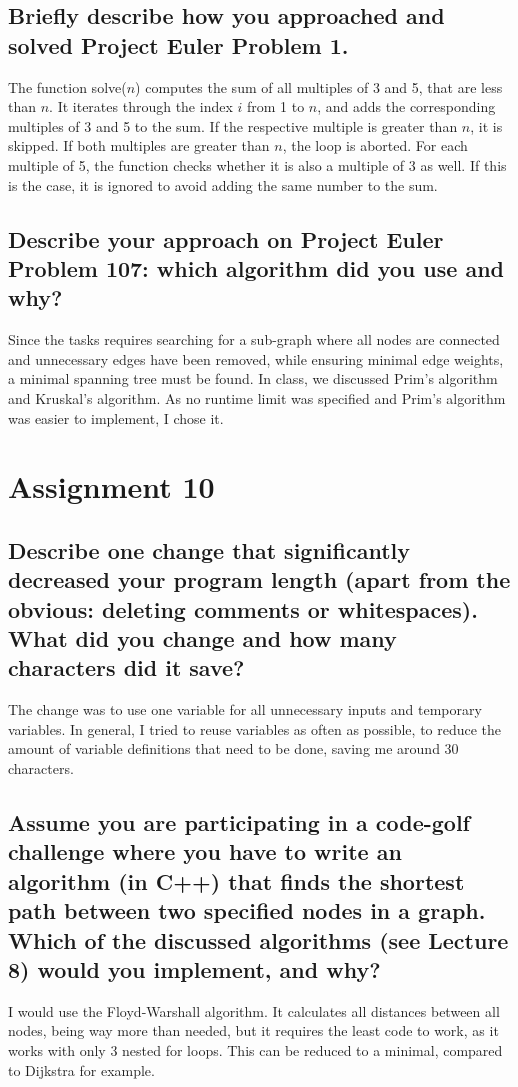 \documentclass[runningheads]{llncs}
\begin{document}
\subsection*{Briefly describe how you approached and solved Project Euler Problem 1.}
The function solve($n$) computes the sum of all multiples of 3 and 5, that are less than $n$. It iterates through the index $i$ from 1 to $n$, and
adds the corresponding multiples of 3 and 5 to the sum. If the respective multiple is greater than $n$, it is skipped. If both multiples are greater than $n$, the
loop is aborted. For each multiple of 5, the function checks whether it is also a multiple of 3 as well. If this is the case, it is ignored to avoid adding the same number to the sum.

\subsection*{Describe your approach on Project Euler Problem 107: which algorithm did you use and why?}
Since the tasks requires searching for a sub-graph where all nodes are connected and unnecessary edges have been removed, while ensuring minimal edge weights,
a minimal spanning tree must be found. In class, we discussed Prim's algorithm and Kruskal's algorithm. As no runtime limit was specified and Prim's algorithm
was easier to implement, I chose it.

\section*{Assignment 10}

\subsection*{Describe one change that significantly decreased your program length (apart from the obvious: deleting comments or whitespaces). What did you change and how many characters did it save?}
The change was to use one variable for all unnecessary inputs and temporary variables. In general, I tried to reuse variables as often as possible, to reduce the amount of variable definitions that need
to be done, saving me around 30 characters.

\subsection*{Assume you are participating in a code-golf challenge where you have to write an algorithm (in C++) that finds the shortest path between two specified nodes in a graph. Which of the discussed algorithms (see Lecture 8) would you implement, and why?}
I would use the Floyd-Warshall algorithm. It calculates all distances between all nodes, being way more than needed, but it requires the least code to work, as it works with only 3
nested for loops. This can be reduced to a minimal, compared to Dijkstra for example.
\end{document}
